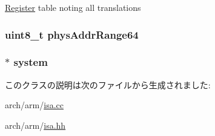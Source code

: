 \hyperlink{classRegister}{Register} table noting all translations \hypertarget{structArmISA_1_1ISA_a4ab96b1a55880cac440e81e794c6f8d7}{
\subsubsection[{physAddrRange64}]{\setlength{\rightskip}{0pt plus 5cm}uint8\_\-t {\bf physAddrRange64}}}
\label{structArmISA_1_1ISA_a4ab96b1a55880cac440e81e794c6f8d7}
\hypertarget{structArmISA_1_1ISA_a5c1351250909b50f57e70dbb5bf443d8}{
\subsubsection[{system}]{$\ast$ {\bf system}}}
\label{structArmISA_1_1ISA_a5c1351250909b50f57e70dbb5bf443d8}


このクラスの説明は次のファイルから生成されました:\begin{DoxyCompactItemize}
\item 
arch/arm/\hyperlink{arm_2isa_8cc}{isa.cc}\item 
arch/arm/\hyperlink{arm_2isa_8hh}{isa.hh}\end{DoxyCompactItemize}
